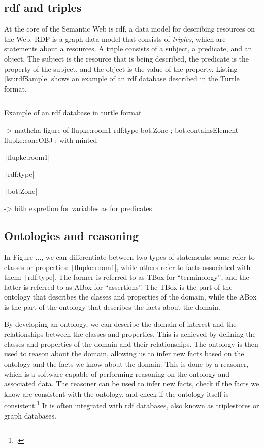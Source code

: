 \subsection{\acs{rdf} and triples}
At the core of the Semantic Web is \ac{rdf}, a data model for describing resources on the Web. RDF is a graph data model that consists of \emph{triples}, which are statements about a resources. A triple consists of a subject, a predicate, and an object. The subject is the resource that is being described, the predicate is the property of the subject, and the object is the value of the property. Listing \ref{lst:rdfSample} shows an example of an \ac{rdf} database described in the Turtle format.

\begin{listing}
	\inputminted{turtle}{figures/snippets/rdfSample.ttl}
	\vspace{-0.7cm}
	\caption{Example of an \ac{rdf} database in turtle format}
	\label{lst:rdfSample}
\end{listing}

-> mathcha figure of flupke:room1 rdf:type bot:Zone ;
bot:containsElement flupke:coneOBJ ; with minted

\texttt|flupke:room1|

\texttt|rdf:type|

\texttt|bot:Zone|

-> bith expretion for variables as for predicates


\subsection{Ontologies and reasoning}\label{subsec:ontologies}
In Figure ..., we can differentiate between two types of statements: some refer to classes or properties: \texttt|flupke:room1|, while others refer to facts associated with them: \texttt|rdf:type|. The former is referred to as TBox for \enquote{terminology}, and the latter is referred to as ABox for \enquote{assertions}. The TBox is the part of the ontology that describes the classes and properties of the domain, while the ABox is the part of the ontology that describes the facts about the domain.

By developing an ontology, we can describe the domain of interest and the relationships between the classes and properties. This is achieved by defining the classes and properties of the domain and their relationships. The ontology is then used to reason about the domain, allowing us to infer new facts based on the ontology and the facts we know about the domain. This is done by a reasoner, which is a software capable of performing reasoning on the ontology and associated data. The reasoner can be used to infer new facts, check if the facts we know are consistent with the ontology, and check if the ontology itself is consistent.\footcite{w3cInfering} It is often integrated with \ac{rdf} databases, also known as triplestores or graph databases.

